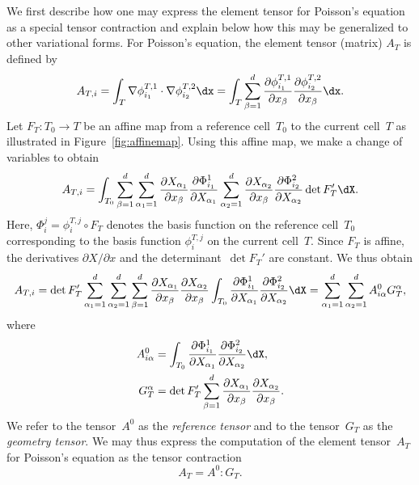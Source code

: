 We first describe how one may express the element tensor for Poisson's
equation as a special tensor contraction and explain below how this
may be generalized to other variational forms. For Poisson's equation,
the element tensor (matrix) $A_T$ is defined by
\begin{equation*}
  A_{T,i} =
  \int_T
  \nabla \phi_{i_1}^{T,1} \cdot
  \nabla \phi_{i_2}^{T,2} \dx
  =
  \int_T
  \sum_{\beta=1}^d
  \frac{\partial \phi_{i_1}^{T,1}}{\partial x_{\beta}}
  \frac{\partial \phi_{i_2}^{T,2}}{\partial x_{\beta}} \dx.
\end{equation*}
Let $F_T : T_0 \rightarrow T$ be an affine map from a reference
cell~$T_0$ to the current cell~$T$ as illustrated in
Figure~\ref{fig:affinemap}. Using this affine map, we make a change of
variables to obtain
\begin{equation}
  A_{T,i} =
  \int_{T_0}
  \sum_{\beta=1}^d
  \sum_{\alpha_1=1}^d
  \frac{\partial X_{\alpha_1}}{\partial x_{\beta}}
  \frac{\partial \Phi^1_{i_1}}{\partial X_{\alpha_1}}
  \sum_{\alpha_2=1}^d
  \frac{\partial X_{\alpha_2}}{\partial x_{\beta}}
  \frac{\partial \Phi^2_{i_2}}{\partial X_{\alpha_2}}
  \det F_T'
  \dX.
\end{equation}
Here, $\Phi_i^j = \phi_i^{T,j} \circ F_T$ denotes the basis function
on the reference cell~$T_0$ corresponding to the basis function
$\phi_i^{T,j}$ on the current cell~$T$. Since $F_T$ is affine, the
derivatives $\partial X / \partial x$ and the determinant~$\det F_T'$
are constant. We thus obtain
\begin{equation}
  A_{T,i} =
  \det F_T'
  \sum_{\alpha_1=1}^d
  \sum_{\alpha_2=1}^d
  \sum_{\beta=1}^d
  \frac{\partial X_{\alpha_1}}{\partial x_{\beta}}
  \frac{\partial X_{\alpha_2}}{\partial x_{\beta}}
  \int_{T_0}
  \frac{\partial \Phi^1_{i_1}}{\partial X_{\alpha_1}}
  \frac{\partial \Phi^2_{i_2}}{\partial X_{\alpha_2}}
  \dX
  =
  \sum_{\alpha_1=1}^d
  \sum_{\alpha_2=1}^d
  A^0_{i\alpha} G_T^{\alpha},
\end{equation}
where
\begin{equation} \label{eq:poisson,AandG}
  \begin{split}
    A^0_{i\alpha}
    &=
    \int_{T_0}
    \frac{\partial \Phi^1_{i_1}}{\partial X_{\alpha_1}}
    \frac{\partial \Phi^2_{i_2}}{\partial X_{\alpha_2}}
    \dX, \\
    G_T^{\alpha}
    &=
    \det F_T'
    \sum_{\beta=1}^d
    \frac{\partial X_{\alpha_1}}{\partial x_{\beta}}
    \frac{\partial X_{\alpha_2}}{\partial x_{\beta}}.
  \end{split}
\end{equation}
We refer to the tensor~$A^0$ as the \emph{reference tensor} and to the
tensor~$G_T$ as the \emph{geometry tensor}. We may thus express the
computation of the element tensor~$A_T$ for Poisson's equation as the
tensor contraction
\begin{equation*}
  A_T = A^0 : G_T.
\end{equation*}

